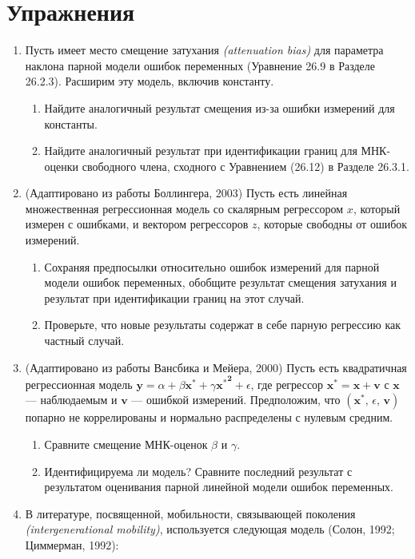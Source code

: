 \section*{Упражнения} 
\begin{enumerate}
\item Пусть имеет место  смещение затухания \emph{(attenuation bias)} для параметра наклона парной модели ошибок переменных (Уравнение 26.9 в Разделе 26.2.3). Расширим эту модель, включив константу.
\begin{enumerate}
\item Найдите аналогичный результат  смещения из-за ошибки измерений для константы.
\item	Найдите аналогичный результат при идентификации границ для МНК-оценки свободного члена, сходного с Уравнением (26.12) в Разделе 26.3.1.
\end{enumerate}
\item (Адаптировано из работы Боллингера, 2003) Пусть есть линейная множественная регрессионная модель со скалярным регрессором $x$, который измерен с ошибками, и вектором регрессоров $z$, которые свободны от ошибок измерений.
\begin{enumerate}
\item Сохраняя предпосылки относительно ошибок измерений для парной модели ошибок переменных, обобщите результат смещения затухания и результат при идентификации границ на этот случай.
\item Проверьте, что новые результаты содержат в себе парную регрессию как частный случай.
\end{enumerate}
\item (Адаптировано из работы Вансбика и Мейера, 2000) Пусть есть квадратичная регрессионная модель $\mathbf{y}=\alpha + \beta\mathbf{x^*}+\gamma\mathbf{{x^*}^2}+\epsilon$, где регрессор $\mathbf{x^*}=\mathbf{x}+\mathbf{v}$ с $\mathbf{x}$ --– наблюдаемым и $\mathbf{v}$ --– ошибкой измерений. Предположим, что $(\mathbf
x^*, \, \epsilon, \, \mathbf{v})$ попарно не коррелированы и нормально распределены с нулевым средним.
\begin{enumerate}
\item	Сравните смещение МНК-оценок $\beta$ и $\gamma$.
\item	Идентифицируема ли модель? Сравните последний результат с результатом оценивания парной линейной модели ошибок переменных.
\end{enumerate}
\item В литературе, посвященной, мобильности, связывающей поколения \emph{(intergenerational mobility)}, используется следующая модель (Солон, 1992; Циммерман, 1992):

\end{enumerate}
